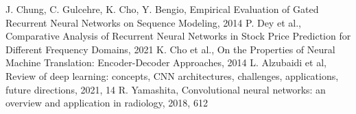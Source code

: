 \documentclass[11pt]{article} %
\begin{document}
\begin{thebibliography}{9}
J. Chung, C. Gulcehre, K. Cho, Y. Bengio, Empirical Evaluation of Gated Recurrent Neural Networks on Sequence Modeling, 2014
P. Dey et al., Comparative Analysis of Recurrent Neural Networks in Stock Price Prediction for Different Frequency Domains, 2021 
K. Cho et al., On the Properties of Neural Machine Translation: Encoder-Decoder Approaches, 2014
L. Alzubaidi et al, Review of deep learning: concepts, CNN architectures, challenges, applications, future directions, 2021, 14
R. Yamashita, Convolutional neural networks: an overview and application in radiology, 2018, 612





\end{thebibliography}
\end{document}
